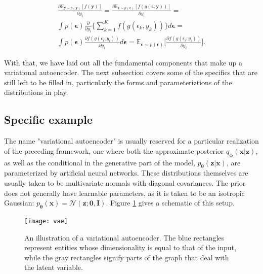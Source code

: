 \documentclass{report}
\begin{document}
\begin{gather*}
\frac{\partial \mathbb{E}_{\boldsymbol{y} \sim p(\boldsymbol{y})} [f(\boldsymbol{y})]}{\partial y_i} = \frac{\partial \mathbb{E}_{\boldsymbol{\epsilon} \sim p(\boldsymbol{\epsilon})} [f(g(\boldsymbol{\epsilon}, \boldsymbol{y}))]}{\partial y_i} = \\
\int p(\boldsymbol{\epsilon}) \frac{\partial}{\partial y_i} \Big\{ \sum_{k=1}^K f(g(\epsilon_k, y_k)) \Big\} d\boldsymbol{\epsilon} = \\
\int p(\boldsymbol{\epsilon}) \frac{\partial f(g(\epsilon_i, y_i))}{\partial y_i}  d\boldsymbol{\epsilon} = \mathbb{E}_{\boldsymbol{\epsilon} \sim p(\boldsymbol{\epsilon})} \big[ \frac{\partial f(g(\epsilon_i, y_i))}{\partial y_i} \big].
\end{gather*}

\bigskip

\noindent With that, we have laid out all the fundamental components that make up a variational autoencoder. The next subsection covers some of the specifics that are still left to be filled in, particularly the forms and parameteriztions of the distributions in play.

\subsection{Specific example}

The name "variational autoencoder" is usually reserved for a particular realization of the preceding framework, one where both the approximate posterior $q_{\boldsymbol{\phi}}(\boldsymbol{x}|\boldsymbol{z})$, as well as the conditional in the generative part of the model, $p_{\boldsymbol{\theta}}(\boldsymbol{z} | \boldsymbol{x})$, are parameterized by artificial neural networks. These distributions themselves are usually taken to be multivariate normals with diagonal covariances. The prior does not generally have learnable parameters, as it is taken to be an isotropic Gaussian: $p_{\boldsymbol{\theta}}(\boldsymbol{x}) = \mathcal{N}(\boldsymbol{z}; \boldsymbol{0}, \boldsymbol{I})$. Figure \ref{fig:vae} gives a schematic of this setup. \\

\begin{figure}[H]
\begin{center}
\texttt{[image: vae]}
\caption{An illustration of a variational autoencoder. The blue rectangles represent entities whose dimensionality is equal to that of the input, while the gray rectangles signify parts of the graph that deal with the latent variable.}
\label{fig:vae}
\end{center}
\end{figure}
\end{document}
